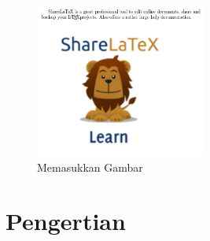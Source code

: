 
\begin{figure}[ht]
	\centerline{\includegraphics[width=0.50\textwidth]{gambar/dapi13.jpg}}
	\caption{Memasukkan Gambar}
	\label{Memasukkan Gambar}
\end{figure}

\section {Pengertian }
